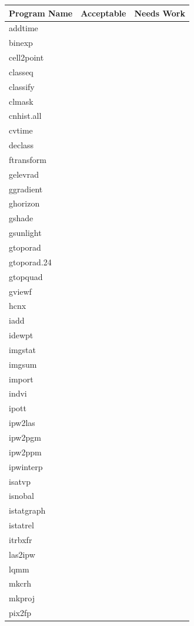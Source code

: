 \begin{tabular}{||l|l|l||} \hline
Program Name & Acceptable & Needs Work \\ \hline\hline
addtime & & \\ \hline
binexp & & \\ \hline
cell2point & & \\ \hline
classeq & & \\ \hline
classify & & \\ \hline
clmask & & \\ \hline
cnhist.all & & \\ \hline
cvtime & & \\ \hline
declass & & \\ \hline
ftransform & & \\ \hline
gelevrad & & \\ \hline
ggradient & & \\ \hline
ghorizon & & \\ \hline
gshade & & \\ \hline
gsunlight & & \\ \hline
gtoporad & & \\ \hline
gtoporad.24 & & \\ \hline
gtopquad & & \\ \hline
gviewf & & \\ \hline
hcnx & & \\ \hline
iadd & & \\ \hline
idewpt & & \\ \hline
imgstat & & \\ \hline
imgsum & & \\ \hline
import & & \\ \hline
indvi & & \\ \hline
ipott & & \\ \hline
ipw2las & & \\ \hline
ipw2pgm & & \\ \hline
ipw2ppm & & \\ \hline
ipwinterp & & \\ \hline
isatvp & & \\ \hline
isnobal & & \\ \hline
istatgraph & & \\ \hline
istatrel & & \\ \hline
itrbxfr & & \\ \hline
las2ipw & & \\ \hline
lqmm & & \\ \hline
mkcrh & & \\ \hline
mkproj & & \\ \hline
pix2fp & & \\ \hline
\end{tabular}

